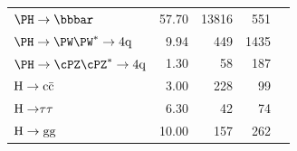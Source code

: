 \begin{table}[htbp]
\begin{center}
\begin{tabular}{|l|r|r|r|r|}
$\Hbb$ & 57.70 & 13816 & 551 \\ %
$\Hww$ & 9.94 & 449 & 1435 \\ %
$\Hzz$ & 1.30 & 58 & 187 \\ %
${\rm H\to c\bar{c}}$ & 3.00 & 228 & 99 \\ %
${\rm H\to} \tau \tau$ & 6.30 & 42 & 74 \\ %
${\rm H\to gg}$ & 10.00 & 157  & 262 \\ \hline
\end{tabular}
\label{table:HbbHww}
\end{center}
\end{table}







\clearpage
